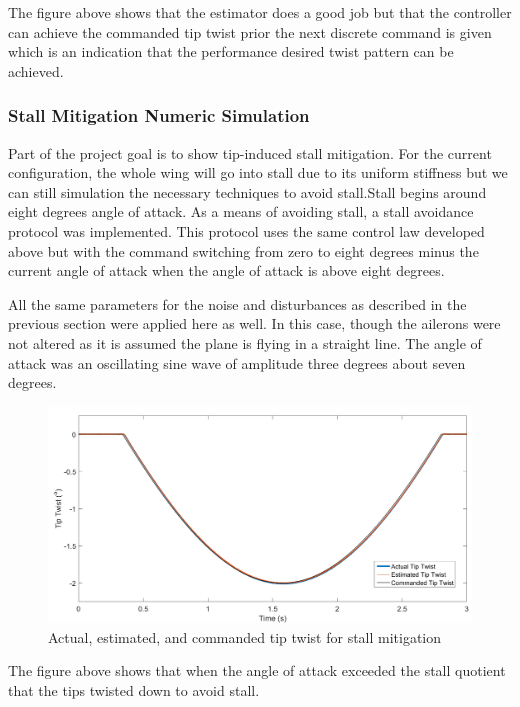 \documentclass[11pt]{ucthesis}
\begin{document}
The figure above shows that the estimator does a good job but that the controller can achieve the commanded tip twist prior the next discrete command is given which is an indication that the performance desired twist pattern can be achieved.

\subsubsection{Stall Mitigation Numeric Simulation}
\label{sec:stallSim}
Part of the project goal is to show tip-induced stall mitigation. For the current configuration, the whole wing will go into stall due to its uniform stiffness but we can still simulation the necessary techniques to avoid stall.Stall begins around eight degrees angle of attack. As a means of avoiding stall, a stall avoidance protocol was implemented. This protocol uses the same control law developed above but with the command switching from zero to eight degrees minus the current angle of attack when the angle of attack is above eight degrees. 

All the same parameters for the noise and disturbances as described in the previous section were applied here as well. In this case, though the ailerons were not altered as it is assumed the plane is flying in a straight line. The angle of attack was an oscillating sine wave of amplitude three degrees about seven degrees.

\begin{figure}[thpb]
\centering
\includegraphics[width=1\linewidth]{Figures/AuroraStallMitigationSimulation.png}
\caption{Actual, estimated, and commanded tip twist for stall mitigation}
\label{fig:APStall}
\end{figure}

The figure above shows that when the angle of attack exceeded the stall quotient that the tips twisted down to avoid stall.
\end{document}
